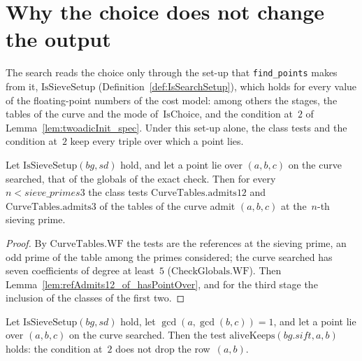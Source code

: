 \section{Why the choice does not change the output}\label{sec:sieveOutput}

The search reads the choice only through the set-up that \texttt{find\_points} makes from it,
$\mathrm{IsSieveSetup}$ (Definition~\ref{def:IsSearchSetup}), which holds for every value of the
floating-point numbers of the cost model: among others the stages, the tables of the curve and the
mode of~$\mathrm{IsChoice}$, and the condition at~$2$ of Lemma~\ref{lem:twoadicInit_spec}. Under
this set-up alone, the class tests and the condition at~$2$ keep every triple over which a point
lies.

\begin{lemma}\label{lem:CurveTables.admits12_of_hasPointOver}
  \leanok
  Let $\mathrm{IsSieveSetup}(\mathit{bg}, \mathit{sd})$ hold, and let a point lie over $(a, b, c)$
  on the curve searched, that of the globals of the exact check. Then for every
  $n < \mathit{sieve\_primes3}$ the class tests $\mathrm{CurveTables.admits12}$ and
  $\mathrm{CurveTables.admits3}$ of the tables of the curve admit $(a, b, c)$ at the~$n$-th sieving
  prime.
\end{lemma}

\begin{proof}
  \leanok
  By $\mathrm{CurveTables.WF}$ the tests are the references at the sieving prime, an odd prime of
  the table among the primes considered; the curve searched has seven coefficients of degree at
  least~$5$ ($\mathrm{CheckGlobals.WF}$). Then Lemma~\ref{lem:refAdmits12_of_hasPointOver}, and for
  the third stage the inclusion of the classes of the first two.
\end{proof}

\begin{lemma}\label{lem:aliveKeeps_of_hasPointOver}
  \leanok
  Let $\mathrm{IsSieveSetup}(\mathit{bg}, \mathit{sd})$ hold, let $\gcd(a, \gcd(b, c)) = 1$, and let
  a point lie over $(a, b, c)$ on the curve searched. Then the test
  $\mathrm{aliveKeeps}(\mathit{bg.sift}, a, b)$ holds: the condition at~$2$ does not drop the
  row~$(a, b)$.
\end{lemma}

